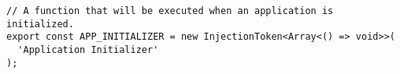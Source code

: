 \begin{verbatim}
// A function that will be executed when an application is initialized.
export const APP_INITIALIZER = new InjectionToken<Array<() => void>>(
  'Application Initializer'
);
\end{verbatim}
